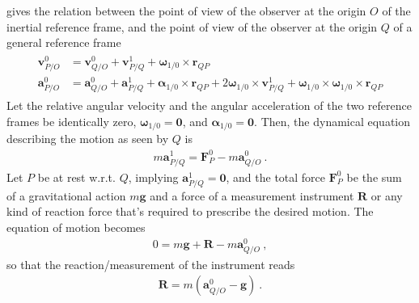 \documentclass[letterpaper,10pt,english]{jupyterBook}
\begin{document}
\sphinxAtStartPar
{\hyperref[\detokenize{ch/kinematics-relative:classical-mechanics-kinematics-relative-points}]{}} gives the relation between the point of view of the observer at the origin \(O\) of the inertial reference frame, and the point of view of the observer at the origin \(Q\) of a general reference frame
\begin{equation*}
\begin{split}\begin{aligned}
  \mathbf{v}^0_{P/O} & = \mathbf{v}^0_{Q/O} + \mathbf{v}^1_{P/Q} + \boldsymbol\omega_{1/0} \times \mathbf{r}_{QP} \\
  \mathbf{a}^0_{P/O} & = \mathbf{a}^0_{Q/O} + \mathbf{a}^1_{P/Q} + \boldsymbol\alpha_{1/0} \times \mathbf{r}_{QP} + 2 \boldsymbol\omega_{1/0} \times \mathbf{v}_{P/Q}^1 + \boldsymbol\omega_{1/0} \times \boldsymbol\omega_{1/0} \times \mathbf{r}_{QP}
\end{aligned}\end{split}
\end{equation*}
\sphinxAtStartPar
{} Let the relative angular velocity and the angular acceleration of the two reference frames be identically zero, \(\boldsymbol\omega_{1/0} = \mathbf{0}\), and \(\boldsymbol\alpha_{1/0} = \mathbf{0}\). Then, the dynamical equation describing the motion as seen by \(Q\) is
\begin{equation*}
\begin{split}m \mathbf{a}^1_{P/Q} = \mathbf{F}^0_P - m \mathbf{a}^0_{Q/O} \ .\end{split}
\end{equation*}
\sphinxAtStartPar
{} Let \(P\) be at rest w.r.t. \(Q\), implying \(\mathbf{a}^1_{P/Q} = \mathbf{0}\), and the total force \(\mathbf{F}^0_P\) be the sum of a gravitational action \(m \mathbf{g}\) and a force of a measurement instrument \(\mathbf{R}\) \sphinxhyphen{} or any kind of reaction force that’s required to prescribe the desired motion. The equation of motion becomes
\begin{equation*}
\begin{split}0 = m \mathbf{g} + \mathbf{R} - m \mathbf{a}^0_{Q/O} \ ,\end{split}
\end{equation*}
\sphinxAtStartPar
so that the reaction/measurement of the instrument reads
\begin{equation*}
\begin{split}\mathbf{R} = m \left( \mathbf{a}^0_{Q/O} - \mathbf{g} \right) \ .\end{split}
\end{equation*}
\end{document}
